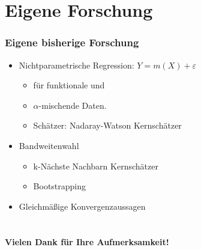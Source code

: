 \documentclass[xcolor=dvipsnames, compress, serif, professionalfont, handout]{beamer}
\begin{document}
  
%
%

\section{Eigene Forschung}
\begin{frame}[fragile]
\frametitle{Eigene bisherige Forschung}
  \begin{itemize}
    \item<1-> Nichtparametrische Regression:
    $
      Y = m(X) + \varepsilon
    $
    \begin{itemize}
      \item<1-> f\"ur funktionale und 
      \item<1-> $\alpha$-mischende Daten.
      \item<1-> Sch\"atzer: Nadaray-Watson Kernsch\"atzer
    \end{itemize}
    \item<2-> Bandweitenwahl
    \begin{itemize}
      \item<2-> k-N\"achste Nachbarn Kernsch\"atzer
      \item<2-> Bootstrapping
    \end{itemize}
    \item<3-> Gleichm\"a{\ss}ige Konvergenzaussagen
  \end{itemize}
\end{frame}

%
%

\section{}
\begin{frame}[fragile]
  \begin{center}
		\Huge{\textbf{Vielen Dank f\"ur Ihre Aufmerksamkeit!}}
	\end{center}
\end{frame}
\end{document}
